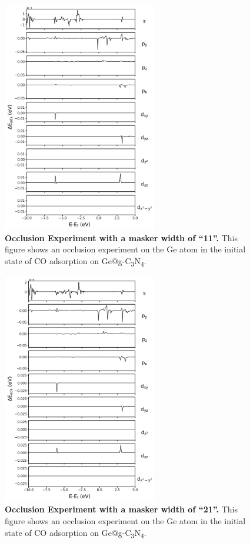 \documentclass[a4paper, 12pt]{article}
\begin{document}
\begin{figure}[htbp]
  \centering
  \includegraphics[width=0.6\textwidth]{supp_fig25_occl_wid11.png}
  \caption{\textbf{Occlusion Experiment with a masker width of ``11''.}
  This figure shows an occlusion experiment on the Ge atom in
  the initial state of CO adsorption on Ge@g-C\textsubscript{3}N\textsubscript{4}.}
  \label{supp_fig25:occl_wid11}
\end{figure}

\begin{figure}[htbp]
  \centering
  \includegraphics[width=0.6\textwidth]{supp_fig26_occl_wid21.png}
  \caption{\textbf{Occlusion Experiment with a masker width of ``21''.}
  This figure shows an occlusion experiment on the Ge atom in
  the initial state of CO adsorption on Ge@g-C\textsubscript{3}N\textsubscript{4}.}
  \label{supp_fig26:occl_wid21}
\end{figure}
\end{document}
